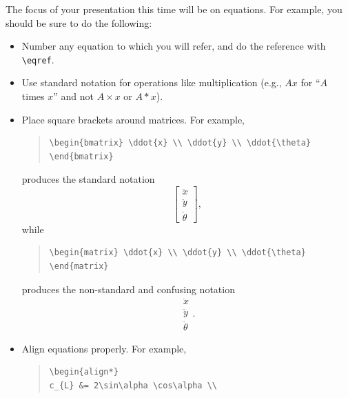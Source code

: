 \documentclass[conf]{new-aiaa}
\begin{document}
The focus of your presentation this time will be on equations. For example, you should be sure to do the following:
\begin{itemize}
\item Number any equation to which you will refer, and do the reference with \lstinline|\eqref|.
\item Use standard notation for operations like multiplication (e.g., $Ax$ for ``$A$ times $x$'' and not $A\times x$ or $A*x$).
\item Place square brackets around matrices. For example,
\begin{quote}
\begin{lstlisting}[language={[LaTeX]TeX}]
\begin{bmatrix} \ddot{x} \\ \ddot{y} \\ \ddot{\theta} \end{bmatrix}
\end{lstlisting}
\end{quote}
produces the standard notation
\begin{equation*}
\begin{bmatrix} \ddot{x} \\ \ddot{y} \\ \ddot{\theta} \end{bmatrix},
\end{equation*}
while
\begin{quote}
\begin{lstlisting}[language={[LaTeX]TeX}]
\begin{matrix} \ddot{x} \\ \ddot{y} \\ \ddot{\theta} \end{matrix}
\end{lstlisting}
\end{quote}
produces the non-standard and confusing notation
\begin{equation*}
\begin{matrix} \ddot{x} \\ \ddot{y} \\ \ddot{\theta} \end{matrix}.
\end{equation*}
\item Align equations properly. For example,
\begin{quote}
\begin{lstlisting}[language={[LaTeX]TeX}]
\begin{align*}
c_{L} &= 2\sin\alpha \cos\alpha \\ 

\end{lstlisting}
\end{quote}
\end{itemize}
\end{document}
